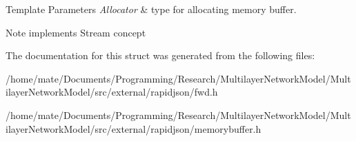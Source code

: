 \begin{DoxyTemplParams}{Template Parameters}
{\em Allocator} & type for allocating memory buffer. \\
\hline
\end{DoxyTemplParams}
\begin{DoxyNote}{Note}
implements Stream concept 
\end{DoxyNote}


The documentation for this struct was generated from the following files\+:\begin{DoxyCompactItemize}
\item 
/home/mate/\+Documents/\+Programming/\+Research/\+Multilayer\+Network\+Model/\+Multilayer\+Network\+Model/src/external/rapidjson/fwd.\+h\item 
/home/mate/\+Documents/\+Programming/\+Research/\+Multilayer\+Network\+Model/\+Multilayer\+Network\+Model/src/external/rapidjson/memorybuffer.\+h\end{DoxyCompactItemize}
